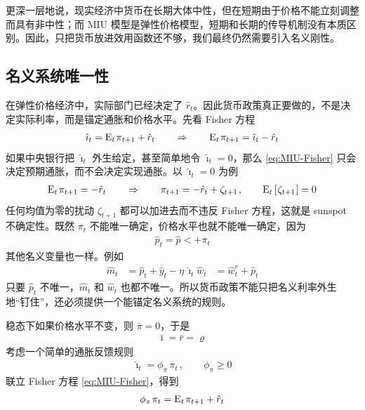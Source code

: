 更深一层地说，现实经济中货币在长期大体中性，但在短期由于价格不能立刻调整而具有非中性；而 MIU 模型是弹性价格模型，短期和长期的传导机制没有本质区别。因此，只把货币放进效用函数还不够，我们最终仍然需要引入名义刚性。

\subsection{名义系统唯一性}


在弹性价格经济中，实际部门已经决定了 \(\hat r_t\)。因此货币政策真正要做的，不是决定实际利率，而是锚定通胀和价格水平。先看 Fisher 方程
\begin{align}
    \hat\imath_t=\meant\,\pi\nt+\hat r_t
    \qquad\Rightarrow\qquad
    \meant\,\pi\nt=\hat\imath_t-\hat r_t\label{eq:MIU-Fisher}
\end{align}
如果中央银行把 \(\hat\imath_t\) 外生给定，甚至简单地令 \(\hat\imath_t=0\)，那么 \ref{eq:MIU-Fisher} 只会决定预期通胀，而不会决定实现通胀。以 \(\hat\imath_t=0\) 为例
\begin{align*}
    \meant\,\pi\nt=-\hat r_t
    \qquad\Rightarrow\qquad
    \pi\nt=-\hat r_t+\zeta_{t+1}\,,\qquad \meant\bks{\zeta_{t+1}}=0
\end{align*}
任何均值为零的扰动 \(\zeta_{t+1}\) 都可以加进去而不违反 Fisher 方程，这就是 sunspot 不确定性。既然 \(\pi_t\) 不能唯一确定，价格水平也就不能唯一确定，因为
\begin{align*}
    \hat p_t=\hat p\lt+\pi_t
\end{align*}
其他名义变量也一样。例如
\begin{align*}
    \hat m_t&=\hat p_t+\hat y_t-\eta\,\hat\imath_t
    \hat w_t&=\hat w^r_t+\hat p_t
\end{align*}
只要 \(\hat p_t\) 不唯一，\(\hat m_t\) 和 \(\hat w_t\) 也都不唯一。所以货币政策不能只把名义利率外生地“钉住”，还必须提供一个能锚定名义系统的规则。

\myskip
{}

稳态下如果价格水平不变，则 \(\bar\pi=0\)，于是
\begin{align*}
    \bar\imath=\bar r=\varrho
\end{align*}
考虑一个简单的通胀反馈规则
\begin{align}
    \hat\imath_t=\phi_\pi\,\pi_t\,,\qquad \phi_\pi\ge0\label{eq:MIU-simple-Taylor-rule}
\end{align}
联立 Fisher 方程 \ref{eq:MIU-Fisher}，得到
\begin{align}
    \phi_\pi\,\pi_t=\meant\,\pi\nt+\hat r_t\label{eq:MIU-inflation-difference}
\end{align}

